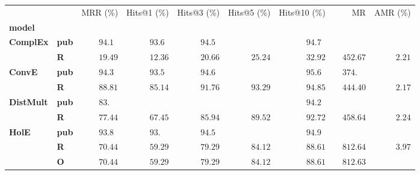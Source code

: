 \begin{tabular}{llrrrrrrr}
\toprule
       &   &           MRR (\%) &        Hits@1 (\%) &        Hits@3 (\%) &        Hits@5 (\%) &       Hits@10 (\%) &                              MR &            AMR (\%) \\
\textbf{model} & {} &                    &                    &                    &                    &                    &                                 &                     \\
\midrule
\textbf{ComplEx} & \textbf{pub} &  $94.1\phantom{0}$ &  $93.6\phantom{0}$ &  $94.5\phantom{0}$ &                    &  $94.7\phantom{0}$ &                                 &                     \\
       & \textbf{R} &            $19.49$ &            $12.36$ &            $20.66$ &            $25.24$ &            $32.92$ &            $\phantom{00}452.67$ &  $\phantom{00}2.21$ \\\midrule
\textbf{ConvE} & \textbf{pub} &  $94.3\phantom{0}$ &  $93.5\phantom{0}$ &  $94.6\phantom{0}$ &                    &  $95.6\phantom{0}$ &  $\phantom{00}374.\phantom{00}$ &                     \\
       & \textbf{R} &            $88.81$ &            $85.14$ &            $91.76$ &            $93.29$ &            $94.85$ &            $\phantom{00}444.40$ &  $\phantom{00}2.17$ \\\midrule
\textbf{DistMult} & \textbf{pub} &  $83.\phantom{00}$ &                    &                    &                    &  $94.2\phantom{0}$ &                                 &                     \\
       & \textbf{R} &            $77.44$ &            $67.45$ &            $85.94$ &            $89.52$ &            $92.72$ &            $\phantom{00}458.64$ &  $\phantom{00}2.24$ \\\midrule
\textbf{HolE} & \textbf{pub} &  $93.8\phantom{0}$ &  $93.\phantom{00}$ &  $94.5\phantom{0}$ &                    &  $94.9\phantom{0}$ &                                 &                     \\
       & \textbf{R} &            $70.44$ &            $59.29$ &            $79.29$ &            $84.12$ &            $88.61$ &            $\phantom{00}812.64$ &  $\phantom{00}3.97$ \\
       & \textbf{O} &            $70.44$ &            $59.29$ &            $79.29$ &            $84.12$ &            $88.61$ &            $\phantom{00}812.63$ &                     \\

\end{tabular}
